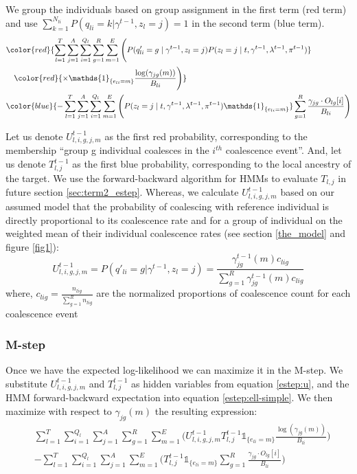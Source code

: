 We group the individuals based on group assignment in the first term (red term) and use $\sum_{k =1}^{N_{li}} P(q_{li} = k | \gamma^{t-1}, z_l = j) = 1$ in the second term (blue term). 
\begin{align}
   &\color{red}{\sum_{l = 1}^T \sum_{j = 1}^A \sum_{i = 1}^{Q_l} \sum_{g = 1}^{R} \sum_{m = 1}^E \Bigg( 
       P(q'_{li} = g \mid \gamma^{t-1}, z_l = j) P(z_l = j \mid t, \gamma^{t-1}, \lambda^{t-1}, \pi^{t-1})} \nonumber \\
   &\quad \color{red}{\times \mathds{1}_{\{e_{l i} = m\}} \frac{\log(\gamma_{jg}(m))}{B_{li}} \Bigg)} \nonumber \\
   &\color{blue}{- \sum_{l = 1}^T \sum_{j = 1}^A \sum_{i = 1}^{Q_l} \sum_{m = 1}^E \Bigg( 
       P(z_l = j \mid t, \gamma^{t-1}, \lambda^{t-1}, \pi^{t-1}) \mathds{1}_{\{e_{l i} = m\}}}  \sum_{g=1}^R \frac{\gamma_{jg} \cdot O_{lg}[i]}{B_{li}} \Bigg)
   \label{estep:ell-simple}
\end{align}

Let us denote $U_{l,i,g,j,m}^{t-1}$ as the first red probability, corresponding to the membership ``group g individual coalesces in the $i^{th}$ coalescence event''. And, let us denote $T_{l,j}^{t-1}$ as the first blue probability, corresponding to the local ancestry of the target. We use the forward-backward algorithm for HMMs to evaluate $T_{l,j}$ in future section \ref{sec:term2_estep}. Whereas, we calculate $U_{l,i,g,j,m}^{t-1}$ based on our assumed model that the probability of coalescing with reference individual is directly proportional to its coalescence rate and for a group of individual on the weighted mean of their individual coalescence rates (see section \ref{the_model} and figure \ref{fig1}):
\begin{equation}
    U_{l,i,g,j,m}^{t-1} = P(q'_{li} = g | \gamma^{t-1}, z_l = j) = \frac{\gamma_{jg}^{t-1}(m)c_{lig}}{\sum_{g=1}^R \gamma_{jg}^{t-1}(m)c_{lig}}
    \label{estep:u}
\end{equation}
where, $c_{lig} = \frac{n_{lig}}{\sum_{g=1}^R n_{lig}}$ are the normalized proportions of coalescence count for each coalescence event

\subsubsection{M-step}

Once we have the expected log-likelihood we can maximize it in the M-step. We substitute $U_{l,i,g,j,m}^{t-1}$ and $T_{l,j}^{t-1}$ as hidden variables from equation \ref{estep:u}, and the HMM forward-backward expectation into equation \ref{estep:ell-simple}. We then maximize with respect to $\gamma_{jg}(m)$ the resulting expression:
\begin{align}
    &\sum_{l = 1}^T \sum_{i = 1}^{Q_l} \sum_{j = 1}^A \sum_{g = 1}^R \sum_{m = 1}^E \Bigg( 
        U_{l,i,g,j,m}^{t-1} T_{l,j}^{t-1} \mathds{1}_{\{e_{l i} = m\}} \frac{\log(\gamma_{jg}(m))}{B_{li}} \Bigg) \nonumber \\
    &- \sum_{l = 1}^T \sum_{i = 1}^{Q_l} \sum_{j = 1}^A \sum_{m = 1}^E \Bigg( 
        T_{l,j}^{t-1} \mathds{1}_{\{e_{l i} = m\}} \sum_{g = 1}^R \frac{\gamma_{jg} \cdot O_{lg}[i]}{B_{li}} \Bigg)
\end{align}

